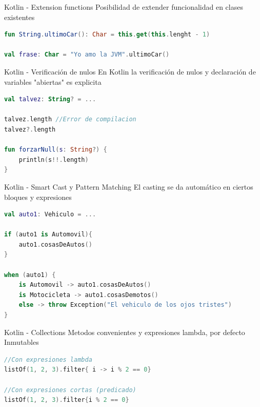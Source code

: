 \documentclass[aspectratio=169]{beamer}
\begin{document}
\begin{frame}[fragile]{Kotlin - Extension functions}
Posibilidad de extender funcionalidad en clases existentes
\begin{lstlisting}[language=Kotlin]
fun String.ultimoCar(): Char = this.get(this.lenght - 1)

val frase: Char = "Yo amo la JVM".ultimoCar()
\end{lstlisting}
    
\end{frame}


\begin{frame}[fragile]{Kotlin - Verificación de nulos}
En Kotlin la verificación de nulos y declaración de variables "abiertas" es explicita
\begin{lstlisting}[language=Kotlin]
val talvez: String? = ...

talvez.length //Error de compilacion
talvez?.length

fun forzarNull(s: String?) {
    println(s!!.length)
}

\end{lstlisting}
    
\end{frame}

\begin{frame}[fragile]{Kotlin - Smart Cast y Pattern Matching}
El casting se da automático en ciertos bloques y expresiones
\begin{lstlisting}[language=Kotlin]
val auto1: Vehiculo = ...

if (auto1 is Automovil){
    auto1.cosasDeAutos()
}

when (auto1) {
    is Automovil -> auto1.cosasDeAutos()
    is Motocicleta -> auto1.cosasDemotos()
    else -> throw Exception("El vehiculo de los ojos tristes")
}

\end{lstlisting}

\end{frame}


\begin{frame}[fragile]{Kotlin - Collections}
Metodos convenientes y expresiones lambda, por defecto Inmutables
\begin{lstlisting}[language=Kotlin]
//Con expresiones lambda
listOf(1, 2, 3).filter{ i -> i % 2 == 0}

//Con expresiones cortas (predicado)
listOf(1, 2, 3).filter{i % 2 == 0}
\end{lstlisting}
\end{frame}
\end{document}
